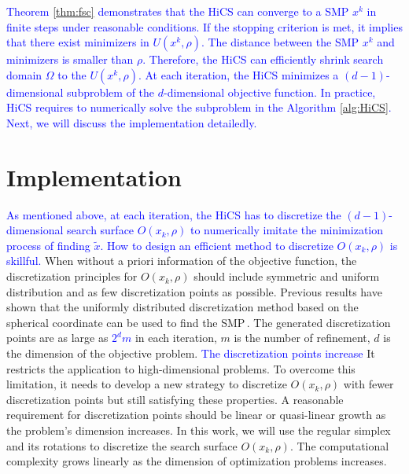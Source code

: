 \documentclass[mathpazo]{csam}
\theoremstyle{remark}
\begin{document}
\textcolor{blue}{ 
Theorem \ref{thm:fsc} demonstrates that the HiCS can converge to a SMP $x^k$ in finite
steps under reasonable conditions. If the stopping criterion is met, it implies
that there exist minimizers in $U(x^k, \rho)$. The distance between the SMP
$x^k$ and minimizers is smaller than $\rho$.
Therefore, the HiCS can efficiently shrink search domain $\Omega$ to the $U(x^k,
\rho)$.  At each iteration, the HiCS minimizes a
$(d-1)$-dimensional subproblem of the $d$-dimensional objective function.
In practice, HiCS requires to numerically solve the subproblem
in the Algorithm \ref{alg:HiCS}.
Next, we will discuss the implementation detailedly. 
}




\section{Implementation}
\label{sec:implement}

\textcolor{blue}{ 
As mentioned above, at each iteration, the HiCS has to discretize 
the $(d-1)$-dimensional search surface $O(x_k,\rho)$
to numerically imitate the minimization process of finding $\tilde{x}$.
How to design an efficient method to discretize $O(x_k,\rho)$ is skillful. 
}
When without a priori information of the objective function, the discretization
principles for $O(x_k,\rho)$ should include symmetric and uniform distribution
and as few discretization points as possible.
Previous results have shown that the uniformly distributed
discretization method based on the spherical coordinate
can be used to find the SMP\,\cite{huang2017hill}. 
The generated discretization points are as large as \textcolor{blue}{$2^{d}m$} in
each iteration, $m$ is the number of refinement, $d$ is the dimension of
the objective problem. 
\textcolor{blue}{ 
The discretization points increase  
}
It restricts the application to high-dimensional problems. 
To overcome this limitation, it needs to develop a new
strategy to discretize $O(x_k,\rho)$ with fewer discretization points
but still satisfying these properties.
A reasonable requirement for discretization points should be
linear or quasi-linear growth as the problem's dimension increases.
In this work, we will use the regular simplex and its rotations to
discretize the search surface $O(x_k,\rho)$. 
The computational complexity grows linearly as the
dimension of optimization problems increases.
\end{document}
